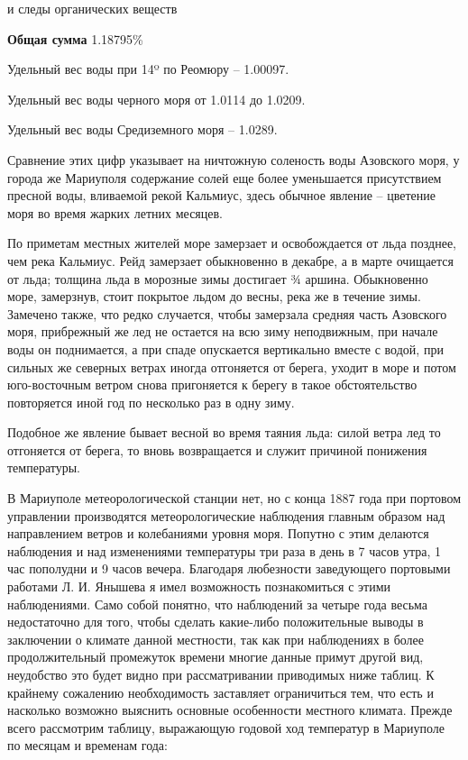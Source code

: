 и следы органических веществ\par
\bigskip

\textbf{Общая сумма} 1.18795\%

Удельный вес воды при 14º по Реомюру – 1.00097.

Удельный вес воды черного моря от 1.0114 до 1.0209.

Удельный вес воды Средиземного моря – 1.0289.

Сравнение этих цифр указывает на ничтожную соленость воды Азовского моря, у
города же Мариуполя содержание солей еще более уменьшается присутствием пресной
воды, вливаемой рекой Кальмиус, здесь обычное явление – цветение моря во время
жарких летних месяцев.

По приметам местных жителей море замерзает и освобождается от льда позднее, чем
река Кальмиус. Рейд замерзает обыкновенно в декабре, а в марте очищается от
льда; толщина льда в морозные зимы достигает ¾ аршина. Обыкновенно море,
замерзнув, стоит покрытое льдом до весны, река же в течение зимы. Замечено
также, что редко случается, чтобы замерзала средняя часть Азовского моря,
прибрежный же лед не остается на всю зиму неподвижным, при начале воды он
поднимается, а при спаде опускается вертикально вместе с водой, при сильных же
северных ветрах иногда отгоняется от берега, уходит в море и потом
юго-восточным  ветром снова пригоняется к берегу в такое обстоятельство
повторяется иной год по несколько раз в одну зиму.

Подобное же явление бывает весной во время таяния льда: силой ветра лед то
отгоняется от берега, то вновь возвращается и служит причиной понижения
температуры.

В Мариуполе метеорологической станции нет, но с конца 1887 года при портовом
управлении производятся метеорологические наблюдения главным образом над
направлением ветров и колебаниями уровня моря. Попутно с этим делаются
наблюдения и над изменениями температуры три раза в день в 7 часов утра, 1 час
пополудни  и 9 часов вечера. Благодаря любезности заведующего портовыми
работами Л. И. Янышева я имел возможность познакомиться с этими наблюдениями.
Само собой понятно, что наблюдений за четыре года весьма недостаточно для того,
чтобы сделать какие-либо положительные выводы в заключении о климате данной
местности, так как при наблюдениях в более продолжительный промежуток времени
многие данные примут другой вид, неудобство это будет видно при рассматривании
приводимых ниже таблиц. К крайнему сожалению необходимость заставляет
ограничиться тем, что есть и насколько возможно выяснить основные особенности
местного климата. Прежде всего рассмотрим таблицу, выражающую годовой ход
температур в Мариуполе по месяцам и временам года:

